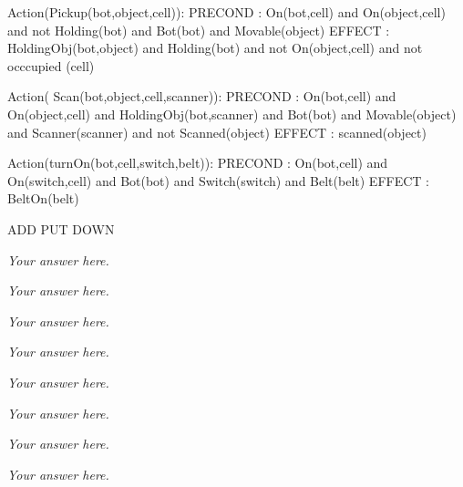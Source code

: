 \documentclass[answers]{exam}
\begin{document}
\begin{questions}
\begin{framed}
{Action(Pickup(bot,object,cell)):
PRECOND : On(bot,cell) and On(object,cell) and
not Holding(bot) and Bot(bot) and Movable(object)
EFFECT : HoldingObj(bot,object) and Holding(bot)
and not On(object,cell) and not occcupied (cell)

Action( Scan(bot,object,cell,scanner)):
PRECOND : On(bot,cell) and On(object,cell) and
 HoldingObj(bot,scanner) and Bot(bot) and Movable(object) and
Scanner(scanner) and not Scanned(object)
EFFECT : scanned(object)

Action(turnOn(bot,cell,switch,belt)):
PRECOND : On(bot,cell) and On(switch,cell) and
Bot(bot) and Switch(switch) and Belt(belt)
EFFECT : BeltOn(belt)

ADD PUT DOWN

}
\end{framed}
\begin{framed}
\emph{Your answer here.}
\end{framed}
\begin{framed}
\emph{Your answer here.}
\end{framed}
\begin{framed}
\emph{Your answer here.}
\end{framed}
\begin{framed}
\emph{Your answer here.}
\end{framed}
\begin{framed}
\emph{Your answer here.}
\end{framed}
\begin{framed}
\emph{Your answer here.}
\end{framed}
\begin{framed}
\emph{Your answer here.}
\end{framed}
\begin{framed}
\emph{Your answer here.}
\end{framed}
\end{questions}
\end{document}
